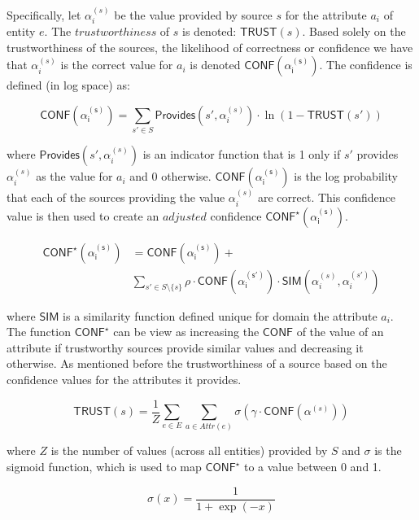 \documentclass{acm_proc_article-sp}
\begin{document}
Specifically, let $\alpha_i^{(s)}$ be the value provided by source $s$ for the attribute $a_i$ of entity $e$. The $trustworthiness$ of $s$ is denoted: $\mathsf{TRUST}(s)$. Based solely on the trustworthiness of the sources, the likelihood of correctness or confidence we have that $\alpha_i^{(s)}$ is the correct value for $a_i$ is denoted $\mathsf{CONF(\alpha_i^{(s)})}$.  The confidence is defined (in log space) as:

\begin{equation}
\mathsf{CONF(\alpha_i^{(s)})} = \sum_{s' \in S} \mathsf{Provides}(s',\alpha_i^{(s)}) \cdot \ln(1-\mathsf{TRUST}(s'))
\end{equation}

where $\mathsf{Provides}(s',\alpha_i^{(s)})$ is an indicator function that is 1 only if $s'$ provides $\alpha_i^{(s)}$ as the value for $a_i$ and 0 otherwise. $\mathsf{CONF(\alpha_i^{(s)})}$ is the log probability that each of the sources providing the value $\alpha_i^{(s)}$ are correct. This confidence value is then used to create an $adjusted$ confidence $\mathsf{CONF^\star(\alpha_i^{(s)})}$.

\begin{align}
\mathsf{CONF^\star(\alpha_i^{(s)})} &= \mathsf{CONF(\alpha_i^{(s)})} + \\ \nonumber
&  \sum_{s' \in S \setminus \{s\}} \rho \cdot \mathsf{CONF(\alpha_i^{(s')})}  \cdot \mathsf{SIM}(\alpha_i^{(s)},\alpha_i^{(s')})
\end{align}

where $\mathsf{SIM}$ is a similarity function defined unique for domain the attribute $a_i$. The function $\mathsf{CONF}^\star$ can be view as increasing  the $\mathsf{CONF}$ of the value of an attribute if trustworthy sources provide similar values and decreasing it otherwise. As mentioned before the trustworthiness of a source based on the confidence values for the attributes it provides. 

\begin{equation}
\mathsf{TRUST}(s) = \frac{1}{Z} \sum_{e \in E}\sum_{a \in Attr(e)} \sigma(\gamma \cdot \mathsf{CONF}(\alpha^{(s)}))
\end{equation}

where $Z$ is the number of values (across all entities) provided by $S$ and $\sigma$ is the sigmoid function, which is used to map $\mathsf{CONF}^\star$ to a value between 0 and 1.

\begin{equation}
\sigma(x) = \frac{1}{1 + \exp{(-x)}}
\end{equation}
\end{document}
